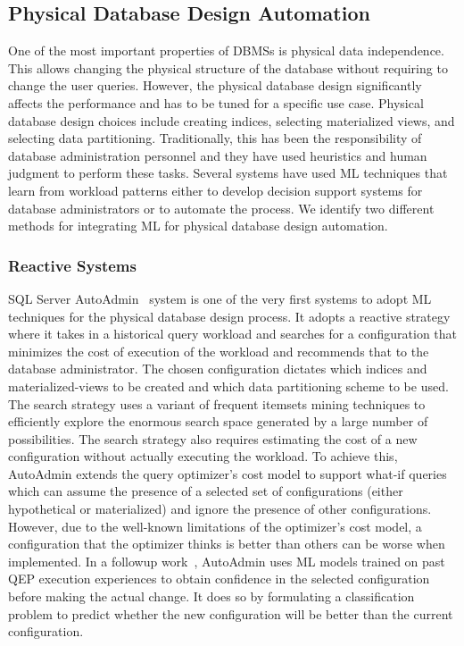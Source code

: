 \subsection{Physical Database Design Automation}
One of the most important properties of  DBMSs is physical data independence.
This allows changing the physical structure of the database without requiring to change the user queries.
However, the physical database design significantly affects the performance and has to be tuned for a specific use case.
Physical database design choices include creating indices, selecting materialized views, and selecting data partitioning.
Traditionally, this has been the responsibility of database administration personnel and they have used heuristics and human judgment to perform these tasks.
Several systems have used ML techniques that learn from workload patterns either to develop decision support systems for database administrators or to automate the process.
We identify two different methods for integrating ML for physical database design automation.

\subsubsection{Reactive Systems}
SQL Server AutoAdmin~\cite{autoadmin} system is one of the very first systems to adopt ML techniques for the physical database design process.
It adopts a reactive strategy where it takes in a historical query workload and searches for a configuration that minimizes the cost of execution of the workload and recommends that to the database administrator.
The chosen configuration dictates which indices and materialized-views to be created and which data partitioning scheme to be used.
The search strategy uses a variant of frequent itemsets mining techniques to efficiently explore the enormous search space generated by a large number of possibilities.
The search strategy also requires estimating the cost of a new configuration without actually executing the workload.
To achieve this, AutoAdmin extends the query optimizer's cost model to support what-if queries which can assume the presence of a selected set of configurations (either hypothetical or materialized) and ignore the presence of other configurations.
However, due to the well-known limitations of the optimizer's cost model, a configuration that the optimizer thinks is better than others can be worse when implemented.
In a followup work~\cite{autoadmin_2}, AutoAdmin uses ML models trained on past QEP execution experiences to obtain confidence in the selected configuration before making the actual change.
It does so by formulating a classification problem to predict whether the new configuration will be better than the current configuration.

